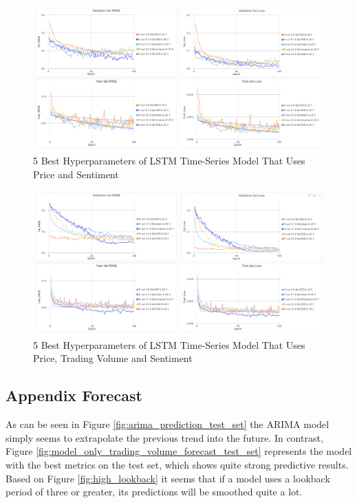 \documentclass[11pt, a4paper]{article}
\begin{document}
\begin{figure}
    \centering
    \includegraphics[width=\textwidth]{Only_Sentiment.png}
    \caption{5 Best Hyperparameters of LSTM Time-Series Model That Uses Price and Sentiment}
\end{figure}

\begin{figure}
    \centering
    \includegraphics[width=\textwidth]{All_Features.png}
    \caption{5 Best Hyperparameters of LSTM Time-Series Model That Uses Price, Trading Volume and Sentiment}
\end{figure}

\pagebreak
\subsection{Appendix Forecast}
\label{appendix:Forecast}
As can be seen in Figure \ref{fig:arima_prediction_test_set} the ARIMA model simply seems to extrapolate the previous trend into the future.
In contrast, Figure \ref{fig:model_only_trading_volume_forecast_test_set} represents the model with the best metrics on the test set, which shows quite strong predictive results.
Based on Figure \ref{fig:high_lookback} it seems that if a model uses a lookback period of three or greater, its predictions
will be smoothed quite a lot.
\end{document}
